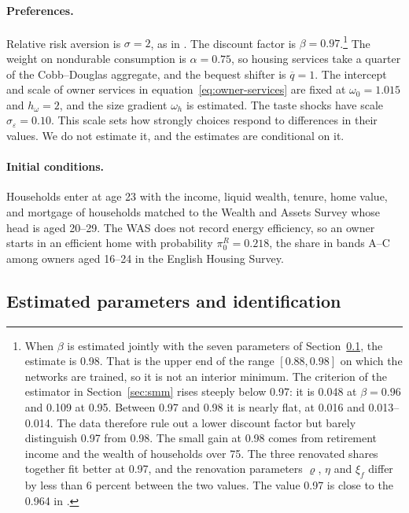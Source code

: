 \paragraph{Preferences.}
Relative risk aversion is $\sigma=2$, as in \citet{kaplan2020housing}.
 The discount factor is $\beta=0.97$.\footnote{ When $\beta$
is estimated jointly with the seven parameters of
Section~\ref{sec:identification}, the estimate is 0.98. That is the upper
end of the range $[0.88,0.98]$ on which the networks are trained, so it is
not an interior minimum. The criterion  of the estimator in
Section~\ref{sec:smm} rises
steeply below 0.97: it is 0.048 at $\beta=0.96$ and 0.109 at 0.95. Between
0.97 and 0.98 it is nearly flat, at 0.016 and 0.013--0.014. The data
therefore rule out a lower discount factor but barely distinguish 0.97 from
0.98. The small gain at 0.98 comes from retirement income and the wealth of
households over 75. The three renovated shares together fit better at
0.97, and the renovation parameters $\varrho$, $\eta$ and $\xi_f$ differ by
less than 6 percent between the two values. The value 0.97 is close to the
0.964 in \citet{kaplan2020housing}.} The
weight on nondurable consumption is $\alpha=0.75$, so housing services
take a quarter of the Cobb--Douglas aggregate, and the bequest shifter is
$\overline q=1$. The intercept and scale of owner services in
equation~\eqref{eq:owner-services} are fixed at $\omega_0=1.015$ and
$h_\omega=2$, and the size gradient $\omega_h$ is estimated.  The taste shocks have scale $\sigma_\varepsilon=0.10$. This
scale sets how strongly choices respond to differences in their values. We
do not estimate it, and the estimates are conditional on it.

\paragraph{Initial conditions.}
Households enter at age 23 with the income, liquid wealth, tenure, home
value, and mortgage of households matched to  the Wealth and Assets Survey whose
head is aged 20--29. The WAS does not record energy efficiency, so an owner starts in an efficient home with probability $\pi^R_0=0.218$, the share in bands A--C among  owners aged 16--24 in the English Housing Survey.

\subsection{Estimated parameters and identification}\label{sec:identification}

